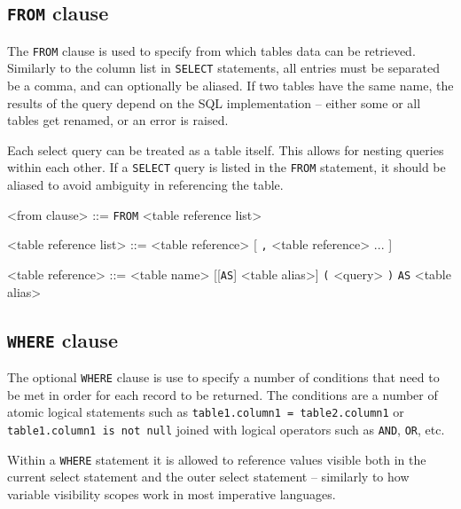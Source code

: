 \documentclass[magisterska,en]{pracamgr}
\newcommand{\code}[1]{\texttt{#1}}
\begin{document}
\subsection{\code{FROM} clause}

The \code{FROM} clause is used to specify from which tables data can be retrieved. Similarly to the column list in \code{SELECT} statements, all entries must be separated be a comma, and can optionally be aliased. If two tables have the same name, the results of the query depend on the SQL implementation -- either some or all tables get renamed, or an error is raised.

Each select query can be treated as a table itself. This allows for nesting queries within each other. If a \code{SELECT} query is listed in the \code{FROM} statement, it should be aliased to avoid ambiguity in referencing the table.


\begin{grammar}
<from clause> ::= \code{FROM} <table reference list>

<table reference list> ::= <table reference> [ { \code{,} <table reference> }... ]

<table reference> ::= <table name> [[\code{AS}] <table alias>] \alt \code{(} <query> \code{)} \code{AS} <table alias> 
\end{grammar}

\subsection{\code{WHERE} clause}

The optional \code{WHERE} clause is use to specify a number of conditions that need to be met in order for each record to be returned. The conditions are a number of atomic logical statements such as \code{table1.column1 = table2.column1} or \code{table1.column1 is not null} joined with logical operators such as \code{AND}, \code{OR}, etc. 

Within a \code{WHERE} statement it is allowed to reference values visible both in the current select statement and the outer select statement -- similarly to how variable visibility scopes work in most imperative languages.
\end{document}

